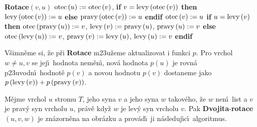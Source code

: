 {\bf Rotace$\left(v,u\right)$\newline} 
$\operatorname{otec}\left(u\right):=\operatorname{otec}\left(v\right)$,\newline 
{\bf if} $v=\operatorname{levy}\left(\operatorname{otec}\left(v\right)\right)$ {\bf then}\newline 
\phantom{---}$\operatorname{levy}\left(\operatorname{otec}\left(v\right)\right):=u$\newline 
{\bf else}\newline 
\phantom{---}$\operatorname{pravy}\left(\operatorname{otec}\left(v\right)\right):=u$\newline 
{\bf endif\newline 
$\operatorname{otec}\left(v\right):=u$\newline 
if} $u=\operatorname{levy}\left(v\right)$ {\bf then}\newline 
\phantom{---}$\operatorname{otec}\left(\operatorname{pravy}\left(u\right)\right):=v$, $\operatorname{levy}\left(v\right):=\operatorname{pravy}\left(u\right)$, $\operatorname{pravy}\left(u\right):=v$\newline 
{\bf else}\newline 
\phantom{---}$\operatorname{otec}\left(\operatorname{levy}\left(u\right)\right):=v$, $\operatorname{pravy}\left(v\right):=\operatorname{levy}\left(u\right)$, $\operatorname{levy}\left(u\right):=v$\newline 
{\bf endif}
\medskip

\flushpar V\v simn\v eme si, \v ze p\v ri {\bf Rotace} m\accent23u\v zeme 
aktualizovat i funkci $p$. Pro vrchol $w\ne u,v$ se jej\'\i\ hodnota 
nem\v en\'\i , nov\'a hodnota $p\left(u\right)$ je rovn\'a p\accent23uvodn\'\i\ hodnot\v e 
$p\left(v\right)$ a novou hodnotu $p\left(v\right)$ dostaneme jako 
$p\left(\operatorname{levy}\left(v\right)\right)+p\left(\operatorname{pravy}\left(v\right)\right)$.
\medskip

\flushpar M\v ejme vrchol $u$ stromu $T$, jeho syna $v$ a jeho 
syna $w$ takov\'eho, \v ze $w$ nen\'\i\ list a $v$ je prav\'y syn 
vrcholu $u$, pr\'av\v e kdy\v z $w$ je lev\'y syn vrcholu $v$. Pak 
{\bf Dvojita}-{\bf rotace$\left(u,v,w\right)$} je zn\'azorn\v ena na obr\'azku a prov\'ad\'\i\ 
ji n\'asleduj\'\i c\'\i\ algoritmus.

\midinsert
\centerline{}
\endcaption
\endinsert
\medskip

